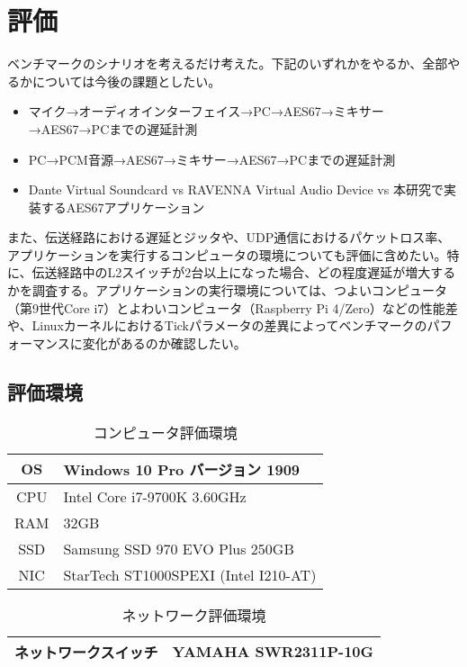 \chapter{評価}
\label{chap:evaluation}

ベンチマークのシナリオを考えるだけ考えた。下記のいずれかをやるか、全部やるかについては今後の課題としたい。

\begin{itemize}
  \item マイク→オーディオインターフェイス→PC→AES67→ミキサー→AES67→PCまでの遅延計測
  \item PC→PCM音源→AES67→ミキサー→AES67→PCまでの遅延計測
  \item Dante Virtual Soundcard vs RAVENNA Virtual Audio Device vs 本研究で実装するAES67アプリケーション
\end{itemize}

また、伝送経路における遅延とジッタや、UDP通信におけるパケットロス率、アプリケーションを実行するコンピュータの環境についても評価に含めたい。特に、伝送経路中のL2スイッチが2台以上になった場合、どの程度遅延が増大するかを調査する。アプリケーションの実行環境については、つよいコンピュータ（第9世代Core i7）とよわいコンピュータ（Raspberry Pi 4/Zero）などの性能差や、LinuxカーネルにおけるTickパラメータの差異によってベンチマークのパフォーマンスに変化があるのか確認したい。

\section{評価環境}

\begin{table}[htb]
  \label{tab:evaluation_computer}
  \caption{コンピュータ評価環境}
  \centering
  \begin{tabular}{c|l} \hline
    OS & Windows 10 Pro バージョン 1909 \\ \hline
    CPU & Intel Core i7-9700K 3.60GHz \\ \hline
    RAM & 32GB \\ \hline
    SSD & Samsung SSD 970 EVO Plus 250GB \\ \hline
    NIC & StarTech ST1000SPEXI (Intel I210-AT) \\ \hline
  \end{tabular}
\end{table}

\begin{table}[htb]
  \label{tab:evaluation_network}
  \caption{ネットワーク評価環境}
  \centering
  \begin{tabular}{c|l} \hline
    ネットワークスイッチ & YAMAHA SWR2311P-10G \\ \hline
  \end{tabular}
\end{table}

